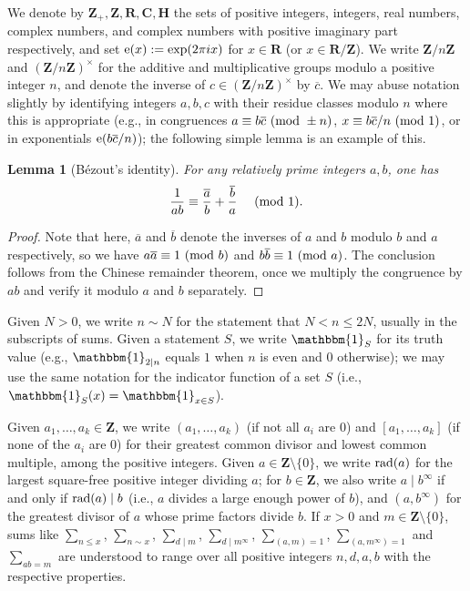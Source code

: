 \documentclass[reqno,11pt]{amsart}
\newtheorem{lemma}[theorem]{Lemma}
\theoremstyle{definition}
\theoremstyle{remark}
\numberwithin{equation}{section}
\newcommand{\Z}{\mathbf{Z}}
\newcommand{\R}{\mathbf{R}}
\newcommand{\C}{\mathbf{C}}
\renewcommand{\H}{\mathbf{H}}
\newcommand{\e}{\textnormal{e}}
\newcommand{\one}{\mathbbm{1}}
\renewcommand{\bar}{\overline}
\renewcommand{\pmod}[1]{\ (\textnormal{mod } #1)}
\newcommand{\rad}{\textnormal{rad}}
\begin{document}
We denote by $\Z_+, \Z, \R, \C, \H$ the sets of positive integers, integers, real numbers, complex numbers, and complex numbers with positive imaginary part respectively, and set $\e(x) := \exp(2 \pi i x)$ for $x \in \R$ (or $x \in \R/\Z$). We write $\Z/n\Z$ and $(\Z/n\Z)^\times$ for the additive and multiplicative groups modulo a positive integer $n$, and denote the inverse of $c \in (\Z/n\Z)^\times$ by $\bar{c}$. We may abuse notation slightly by identifying integers 
$a, b, c$ with their residue classes modulo $n$ where this is appropriate (e.g., in congruences $a \equiv b \bar{c} \pmod{\pm n}$, $x \equiv b\bar{c}/n \pmod{1}$, or in exponentials $\e (b \bar{c}/n)$); the following simple lemma is an example of this.

\begin{lemma}[B\'ezout's identity] \label{lem:bezout}
For any relatively prime integers $a, b$, one has
\[
    \frac{1}{ab} \equiv \frac{\bar{a}}{b} + \frac{\bar{b}}{a} \quad \pmod{1}.
\]
\end{lemma}
\begin{proof}
Note that here, $\bar{a}$ and $\bar{b}$ denote the inverses of $a$ and $b$ modulo $b$ and $a$ respectively, so we have $a \bar{a} \equiv 1 \pmod{b}$ and $b \bar{b} \equiv 1 \pmod{a}$. The conclusion follows from the Chinese remainder theorem, once we multiply the congruence by $ab$ and verify it modulo $a$ and $b$ separately.
\end{proof}

Given $N > 0$, we write $n \sim N$ for the statement that $N < n \le 2N$, usually in the subscripts of sums. Given a statement $S$, we write $\one_S$ for its truth value (e.g., $\one_{2 \mid n}$ equals $1$ when $n$ is even and $0$ otherwise); we may use the same notation for the indicator function of a set $S$ (i.e., $\one_S(x) = \one_{x \in S}$). 

Given $a_1, \ldots, a_k \in \Z$, we write $(a_1, \ldots, a_k)$ (if not all $a_i$ are $0$) and $[a_1, \ldots, a_k]$ (if none of the $a_i$ are $0$) for their greatest common divisor and lowest common multiple, among the positive integers. 
Given $a \in \Z \setminus \{0\}$, we write $\rad(a)$ for the largest square-free positive integer dividing $a$; for $b \in \Z$, we also write $a \mid b^\infty$ if and only if $\rad(a) \mid b$ (i.e., $a$ divides a large enough power of $b$), and $(a, b^\infty)$ for the greatest divisor of $a$ whose prime factors divide $b$. If $x > 0$ and $m \in \Z \setminus \{0\}$, sums like $\sum_{n \le x}$, $\sum_{n \sim x}$, $\sum_{d \mid m}$, $\sum_{d \mid m^\infty}$, $\sum_{(a, m) = 1}$, $\sum_{(a, m^\infty) = 1}$ and $\sum_{ab = m}$ are understood to range over all positive integers $n, d, a, b$ with the respective properties. 
\end{document}
